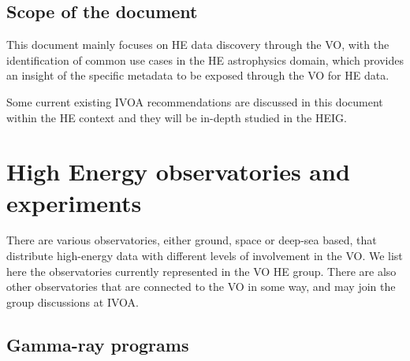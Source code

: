 \documentclass[11pt,a4paper]{ivoa}
\begin{document}
\subsection{Scope of the document}

This document mainly focuses on HE data discovery through the VO, with the identification of common use cases in the HE astrophysics domain, which provides an insight of the specific metadata to be exposed through the VO for HE data.

Some current existing IVOA recommendations are discussed in this document within the HE context and they will be in-depth
studied in the  HEIG.









\section{High Energy observatories and experiments}

There are various observatories, either ground, space or deep-sea based, that distribute high-energy data with
different levels of involvement in the VO. We list here the observatories currently represented in the VO HE group.
There are also other observatories that are connected to the VO in some way, and may join the group discussions at IVOA.


\subsection{Gamma-ray programs}
\end{document}
